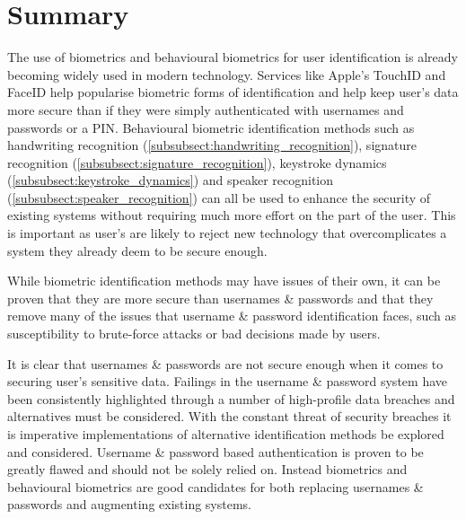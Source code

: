 \documentclass[12pt]{article}
\begin{document}
	\section{Summary}
	The use of biometrics and behavioural biometrics for user identification is already becoming widely used in modern technology. Services like Apple's TouchID and FaceID help popularise biometric forms of identification and help keep user's data more secure than if they were simply authenticated with usernames and passwords or a PIN. Behavioural biometric identification methods such as handwriting recognition (\ref{subsubsect:handwriting_recognition}), signature recognition (\ref{subsubsect:signature_recognition}), keystroke dynamics (\ref{subsubsect:keystroke_dynamics}) and speaker recognition (\ref{subsubsect:speaker_recognition}) can all be used to enhance the security of existing systems without requiring much more effort on the part of the user. This is important as user's are likely to reject new technology that overcomplicates a system they already deem to be secure enough.
	
	While biometric identification methods may have issues of their own, it can be proven that they are more secure than usernames \& passwords and that they remove many of the issues that username \& password identification faces, such as susceptibility to brute-force attacks or bad decisions made by users.
	
	It is clear that usernames \& passwords are not secure enough when it comes to securing user's sensitive data. Failings in the username \& password system have been consistently highlighted through a number of high-profile data breaches and alternatives must be considered. With the constant threat of security breaches it is imperative implementations of alternative identification methods be explored and considered. Username \& password based authentication is proven to be greatly flawed and should not be solely relied on. Instead biometrics and behavioural biometrics are good candidates for both replacing usernames \& passwords and augmenting existing systems.
	
	
	 
	
\end{document}
